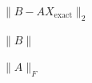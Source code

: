 \documentclass{article}
\begin{document}
$\|B - A X_{\text{exact}}\|_2$
\pagebreak

$\|B\|$
\pagebreak

$\|A\|_F$
\pagebreak
\end{document}
